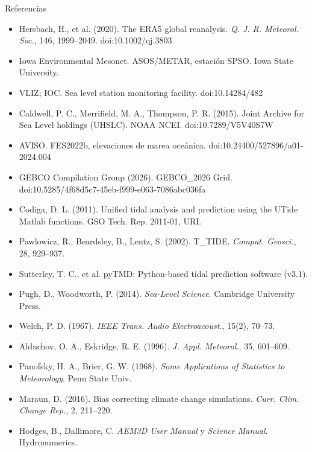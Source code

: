 \documentclass[aspectratio=169,10pt]{beamer}
\begin{document}
\begin{frame}{Referencias}
  \scriptsize
  \begin{itemize}
    \item Hersbach, H., et al. (2020). The ERA5 global reanalysis. \emph{Q. J. R. Meteorol. Soc.}, 146, 1999--2049. doi:10.1002/qj.3803
    \item Iowa Environmental Mesonet. ASOS/METAR, estación SPSO. Iowa State University.
    \item VLIZ; IOC. Sea level station monitoring facility. doi:10.14284/482
    \item Caldwell, P. C., Merrifield, M. A., Thompson, P. R. (2015). Joint Archive for Sea Level holdings (UHSLC). NOAA NCEI. doi:10.7289/V5V40S7W
    \item AVISO. FES2022b, elevaciones de marea oceánica. doi:10.24400/527896/a01-2024.004
    \item GEBCO Compilation Group (2026). GEBCO\_2026 Grid. doi:10.5285/4f68d5c7-45eb-f999-e063-7086abc036fa
    \item Codiga, D. L. (2011). Unified tidal analysis and prediction using the UTide Matlab functions. GSO Tech. Rep. 2011-01, URI.
    \item Pawlowicz, R., Beardsley, B., Lentz, S. (2002). T\_TIDE. \emph{Comput. Geosci.}, 28, 929--937.
    \item Sutterley, T. C., et al. pyTMD: Python-based tidal prediction software (v3.1).
    \item Pugh, D., Woodworth, P. (2014). \emph{Sea-Level Science}. Cambridge University Press.
    \item Welch, P. D. (1967). \emph{IEEE Trans. Audio Electroacoust.}, 15(2), 70--73.
    \item Alduchov, O. A., Eskridge, R. E. (1996). \emph{J. Appl. Meteorol.}, 35, 601--609.
    \item Panofsky, H. A., Brier, G. W. (1968). \emph{Some Applications of Statistics to Meteorology}. Penn State Univ.
    \item Maraun, D. (2016). Bias correcting climate change simulations. \emph{Curr. Clim. Change Rep.}, 2, 211--220.
    \item Hodges, B., Dallimore, C. \emph{AEM3D User Manual} y \emph{Science Manual}. Hydronumerics.
  \end{itemize}
\end{frame}
\end{document}
